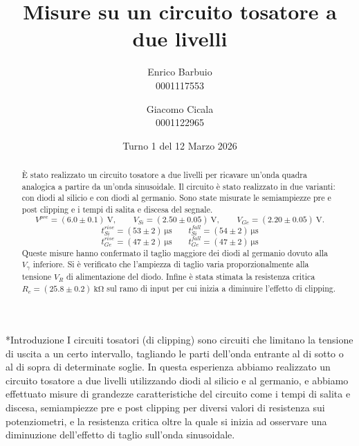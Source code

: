 \documentclass[12pt,italian]{article}
\title{Misure su un circuito tosatore a due livelli}
\author{Enrico Barbuio \\ 0001117553 \and Giacomo Cicala \\ 0001122965}
\date{Turno 1 del 12 Marzo 2026}
\makeatletter
\numberwithin{table}{section}
\let\oldsection\section
\renewcommand{\section}{\@ifstar{\@mystarsection}{\@mynormsection}}
\newcommand{\@mystarsection}[1]{%
    \oldsection*{#1}%
    \phantomsection%
    \addcontentsline{toc}{section}{#1}%
}
\newcommand{\@mynormsection}[2][]{%
    \if\relax\detokenize{#1}\relax
        \oldsection{#2}%
    \else
        \oldsection[#1]{#2}%
    \fi
}
\makeatother
\begin{document}
\maketitle

\begin{abstract}
	\`E stato realizzato un circuito tosatore a due livelli per ricavare un'onda
	quadra analogica a partire da un'onda sinusoidale.
	Il circuito è stato realizzato in due varianti: con diodi al silicio e con
	diodi al germanio.
	Sono state misurate le semiampiezze pre e post clipping e i tempi di salita e
	discesa del segnale.
	\[
		V^{pre} = (6.0 \pm 0.1) \ \unit{\volt}, \qquad
		V_{Si} = (2.50 \pm 0.05) \ \unit{\volt}, \qquad
		V_{Ge} = (2.20 \pm 0.05) \ \unit{\volt}.
	\]
	\[
		t^{rise}_{Si} = (53 \pm 2) \ \unit{\micro\second} \qquad
		t^{fall}_{Si} = (54 \pm 2) \ \unit{\micro\second}
	\]
	\[
		t^{rise}_{Ge} = (47 \pm 2) \ \unit{\micro\second} \qquad
		t^{fall}_{Ge} = (47 \pm 2) \ \unit{\micro\second}
	\]
	Queste misure hanno confermato il taglio maggiore dei diodi al germanio dovuto
	alla $V_\gamma$ inferiore. Si è verificato che l'ampiezza di taglio varia
	proporzionalmente alla tensione $V_R$ di alimentazione del diodo. Infine è
	stata stimata la resistenza critica $R_c = (25.8 \pm 0.2) \ \unit{\kilo\ohm}$
	sul ramo di input per cui inizia a diminuire l'effetto di clipping.

\end{abstract}

\section*{Introduzione}
I circuiti tosatori (di clipping) sono circuiti che limitano la tensione di
uscita a un certo intervallo, tagliando le parti dell'onda entrante al di sotto
o al di sopra di determinate soglie. In questa esperienza abbiamo realizzato un
circuito tosatore a due livelli utilizzando diodi al silicio e al germanio, e
abbiamo effettuato misure di grandezze caratteristiche del circuito come i
tempi di salita e discesa, semiampiezze pre e post clipping per diversi valori
di resistenza sui potenziometri, e la resistenza critica oltre la quale si
inizia ad osservare una diminuzione dell'effetto di taglio sull'onda
sinusoidale.
\end{document}

